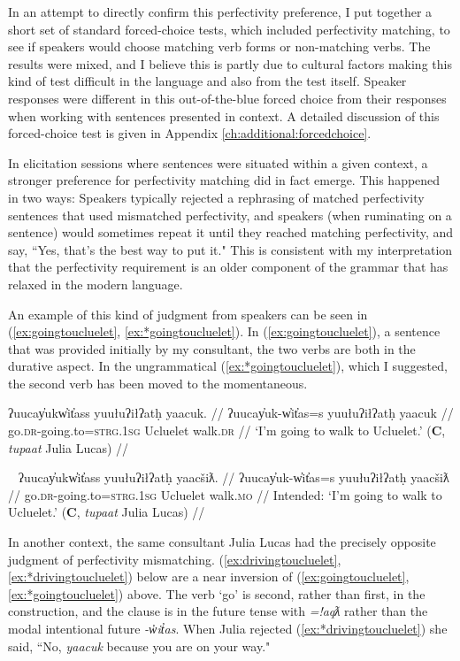 In an attempt to directly confirm this perfectivity preference, I put together a short set of standard forced-choice tests, which included perfectivity matching, to see if speakers would choose matching verb forms or non-matching verbs. The results were mixed, and I believe this is partly due to cultural factors making this kind of test difficult in the language and also from the test itself. Speaker responses were different in this out-of-the-blue forced choice from their responses when working with sentences presented in context. A detailed discussion of this forced-choice test is given in Appendix \ref{ch:additional:forcedchoice}.

In elicitation sessions where sentences were situated within a given context, a stronger preference for perfectivity matching did in fact emerge. This happened in two ways: Speakers typically rejected a rephrasing of matched perfectivity sentences that used mismatched perfectivity, and speakers (when ruminating on a sentence) would sometimes repeat it until they reached matching perfectivity, and say, ``Yes, that's the best way to put it." This is consistent with my interpretation that the perfectivity requirement is an older component of the grammar that has relaxed in the modern language.

An example of this kind of judgment from speakers can be seen in (\ref{ex:goingtoucluelet}, \ref{ex:*goingtoucluelet}). In (\ref{ex:goingtoucluelet}), a sentence that was provided initially by my consultant, the two verbs are both in the durative aspect. In the ungrammatical (\ref{ex:*goingtoucluelet}), which I suggested, the second verb has been moved to the momentaneous.

\ex \label{ex:goingtoucluelet}
\begingl
\glpreamble ʔuucay̓ukw̓it̓ass yuułuʔiłʔatḥ yaacuk. //
\gla ʔuucay̓uk-w̓it̓as=s yuułuʔiłʔatḥ yaacuk //
\glb go.\textsc{dr}-going.to=\textsc{strg.1sg} Ucluelet walk.\textsc{dr} //
\glft `I'm going to walk to Ucluelet.' (\textbf{C}, \textit{tupaat} Julia Lucas) //
\endgl
\xe

\ex~ \label{ex:*goingtoucluelet}
\begingl
\glpreamble *ʔuucay̓ukw̓it̓ass yuułuʔiłʔatḥ yaacšiƛ. //
\gla ʔuucay̓uk-w̓it̓as=s yuułuʔiłʔatḥ yaacšiƛ //
\glb go.\textsc{dr}-going.to=\textsc{strg.1sg} Ucluelet walk.\textsc{mo} //
\glft Intended: `I'm going to walk to Ucluelet.' (\textbf{C}, \textit{tupaat} Julia Lucas) //
\endgl
\xe

In another context, the same consultant Julia Lucas had the precisely opposite judgment of perfectivity mismatching. (\ref{ex:drivingtoucluelet}, \ref{ex:*drivingtoucluelet}) below are a near inversion of (\ref{ex:goingtoucluelet}, \ref{ex:*goingtoucluelet}) above. The verb `go' is second, rather than first, in the construction, and the clause is in the future tense with \textit{=!aqƛ} rather than the modal intentional future \textit{-w̓it̓as}.  When Julia rejected (\ref{ex:*drivingtoucluelet}) she said, ``No, \textit{yaacuk} because you are on your way."

